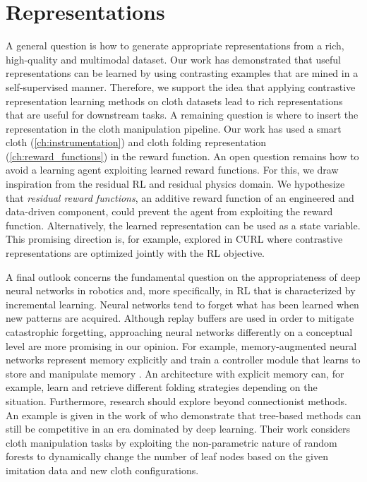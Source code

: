 \documentclass[\home/main.tex]{subfiles}
\begin{document}
\section{Representations} \label{sec:towards_sensing_representation}

A general question is how to generate appropriate representations from a rich, high-quality and multimodal dataset.
Our work has demonstrated that useful representations can be learned by using contrasting examples that are mined in a self-supervised manner. Therefore, we support the idea that applying contrastive representation learning methods on cloth datasets lead to rich representations that are useful for downstream tasks. A remaining question is where to insert the representation in the cloth manipulation pipeline.
Our work has used a smart cloth (\cref{ch:instrumentation}) and cloth folding representation (\cref{ch:reward_functions}) in the reward function. An open question remains how to avoid a learning agent exploiting learned reward functions. For this, we draw inspiration from the residual RL and residual physics domain. We hypothesize that \emph{residual reward functions}, an additive reward function of an engineered and data-driven component, could prevent the agent from exploiting the reward function. Alternatively, the learned representation can be used as a state variable. This promising direction is, for example, explored in CURL \autocite{Srinivas2020CURL} where contrastive representations are optimized jointly with the RL objective.

A final outlook concerns the fundamental question on the appropriateness of deep neural networks in robotics and, more specifically, in \gls{RL} that is characterized by incremental learning. Neural networks tend to forget what has been learned when new patterns are acquired. Although replay buffers are used in order to mitigate catastrophic forgetting, approaching neural networks differently on a conceptual level are more promising in our opinion. For example, memory-augmented neural networks represent memory explicitly and train a controller module that learns to store and manipulate memory \autocite{graves2014neural}. An architecture with explicit memory can, for example, learn and retrieve different folding strategies depending on the situation. Furthermore, research should explore beyond connectionist methods. An example is given in the work of \textcite{Jia2019} who demonstrate that tree-based methods can still be competitive in an era dominated by deep learning. Their work considers cloth manipulation tasks by exploiting the non-parametric nature of random forests to dynamically change the number of leaf nodes based on the given imitation data and new cloth configurations.
\end{document}
